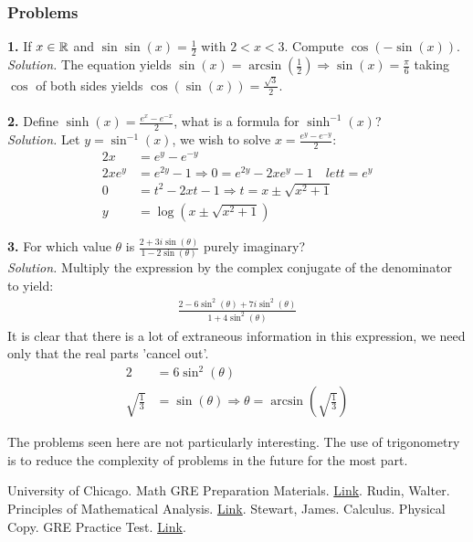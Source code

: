 \subsubsection{Problems}
\textbf{1.} If $x \in \mathbb{R}$ and $\sin\sin(x) = \frac{1}{2}$ with $2 < x < 3$. Compute $\cos(-\sin(x))$.\\

\textit{Solution.} The equation yields $\sin(x) = \arcsin\left(\frac{1}{2}\right) \Rightarrow \sin(x) = \frac{\pi}{6}$ taking $\cos$ of both sides 
yields $\cos(\sin(x)) = \frac{\sqrt{3}}{2}$.\\\\

\textbf{2.} Define $\sinh(x) = \frac{e^{x}-e^{-x}}{2}$, what is a formula for $\sinh^{-1}(x)$?\\

\textit{Solution.} Let $y = \sin^{-1}(x)$, we wish to solve $x = \frac{e^{y}-e^{-y}}{2}$:
\begin{align*}
	2x &= e^{y}-e^{-y}\\
	2xe^{y} &= e^{2y} - 1 \Rightarrow 0 = e^{2y} - 2xe^{y} - 1 \quad let t = e^{y}\\
	0 &= t^2 - 2xt - 1 \Rightarrow t = x \pm \sqrt{x^2 + 1}\\
	y &= \log(x \pm \sqrt{x^2 + 1})
\end{align*}

\textbf{3.} For which value $\theta$ is $\frac{2+3i\sin(\theta)}{1-2\sin(\theta)}$ purely imaginary?\\

\textit{Solution.} Multiply the expression by the complex conjugate of the denominator to yield:
\begin{align*}
	\frac{2 - 6\sin^{2}(\theta)+7i\sin^{2}(\theta)}{1 + 4\sin^{2}(\theta)}
\end{align*}
It is clear that there is a lot of extraneous information in this expression, we need only that the real parts 'cancel out'.
\begin{align*}
	2 &= 6\sin^{2}(\theta)\\
	\sqrt{\frac{1}{3}} &= \sin(\theta) \Rightarrow \theta = \arcsin\left(\sqrt{\frac{1}{3}}\right)
\end{align*}

The problems seen here are not particularly interesting. The use of trigonometry is to
reduce the complexity of problems in the future for the most part.
\begin{thebibliography}{9}
	University of Chicago. Math GRE Preparation Materials. \href{https://math.uchicago.edu/~min/GRE/}{Link}.
	Rudin, Walter. Principles of Mathematical Analysis. \href{https://notendur.hi.is/vae11/\%C3\%9Eekking/principles_of_mathematical_analysis_walter_rudin.pdf}{Link}.
	Stewart, James. Calculus. Physical Copy.
	GRE Practice Test. \href{https://www.ets.org/s/gre/pdf/practice_book_math.pdf}{Link}. 
\end{thebibliography}


